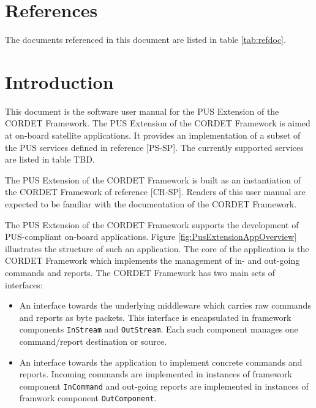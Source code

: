 \documentclass{pnp_article}
\begin{document}
\maketitle


\newpage
\tableofcontents




\section{References}
The documents referenced in this document are listed in table \ref{tab:refdoc}.

\listofreferencedocs{\PxUm}

\section{Introduction}
This document is the software user manual for the PUS Extension of the CORDET Framework. The PUS Extension of the CORDET Framework is aimed at on-board satellite applications. It provides an implementation of a subset of the PUS services defined in reference [PS-SP]. The currently supported services are listed in table TBD.

The PUS Extension of the CORDET Framework is built as an instantiation of the CORDET Framework of reference [CR-SP]. Readers of this user manual are expected to be familiar with the documentation of the CORDET Framework.

The PUS Extension of the CORDET Framework supports the development of  PUS-compliant on-board applications. Figure \ref{fig:PusExtensionAppOverview} illustrates the structure of such an application. The core of the application is the CORDET Framework which implements the management of in- and out-going commands and reports. The CORDET Framework has two main sets of interfaces:

\begin{itemize}
\item An interface towards the underlying middleware which carries raw commands and reports as byte packets. This interface is encapsulated in framework components \texttt{InStream} and \texttt{OutStream}. Each such component manages one command/report destination or source.
\item An interface towards the application to implement concrete commands and reports. Incoming commands are implemented in instances of framework component \texttt{InCommand} and out-going reports are implemented in instances of framwork component \texttt{OutComponent}. 
\end{itemize}
\end{document}
